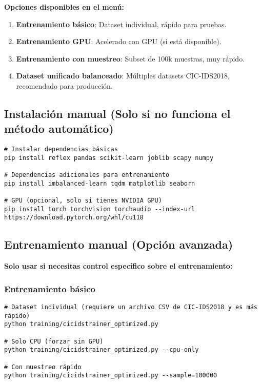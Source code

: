 \textbf{Opciones disponibles en el menú:}
\begin{enumerate}
  \item \textbf{Entrenamiento básico}: Dataset individual, rápido para pruebas.
  \item \textbf{Entrenamiento GPU}: Acelerado con GPU (si está disponible).
  \item \textbf{Entrenamiento con muestreo}: Subset de 100k muestras, muy rápido.
  \item \textbf{Dataset unificado balanceado}: Múltiples datasets CIC-IDS2018, recomendado para producción.
\end{enumerate}

\subsection*{Instalación manual (Solo si no funciona el método automático)}
\begin{lstlisting}[style=tfgbash,caption={Instalación manual de dependencias},label=List.ManualInstall]
# Instalar dependencias básicas
pip install reflex pandas scikit-learn joblib scapy numpy

# Dependencias adicionales para entrenamiento
pip install imbalanced-learn tqdm matplotlib seaborn

# GPU (opcional, solo si tienes NVIDIA GPU)
pip install torch torchvision torchaudio --index-url https://download.pytorch.org/whl/cu118
\end{lstlisting}

\subsection*{Entrenamiento manual (Opción avanzada)}
\textbf{Solo usar si necesitas control específico sobre el entrenamiento:}

\subsubsection*{Entrenamiento básico}
\begin{lstlisting}[style=tfgbash,caption={Entrenamiento con dataset individual},label=List.BasicTrain]
# Dataset individual (requiere un archivo CSV de CIC-IDS2018 y es más rápido)
python training/cicidstrainer_optimized.py

# Solo CPU (forzar sin GPU)
python training/cicidstrainer_optimized.py --cpu-only

# Con muestreo rápido
python training/cicidstrainer_optimized.py --sample=100000
\end{lstlisting}

